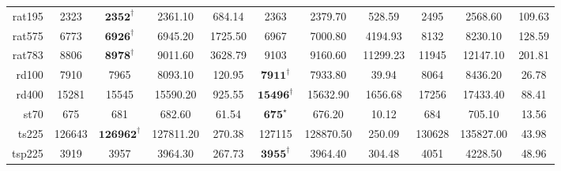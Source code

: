\documentclass[12pt]{ctexart}
\begin{document}
\begin{table}[htbp]
\begin{tabular}{rcccccccccc}
        rat195                        & 2323                              & $\textbf{2352}^\dag$        & 2361.10                                & 684.14           & 2363                    & 2379.70          & 528.59           & 2495                  & 2568.60          & 109.63           \\
        rat575                        & 6773                              & $\textbf{6926}^\dag$        & 6945.20                                & 1725.50          & 6967                    & 7000.80          & 4194.93          & 8132                  & 8230.10          & 128.59           \\
        rat783                        & 8806                              & $\textbf{8978}^\dag$        & 9011.60                                & 3628.79          & 9103                    & 9160.60          & 11299.23         & 11945                 & 12147.10         & 201.81           \\
        rd100                         & 7910                              & 7965                        & 8093.10                                & 120.95           & $\textbf{7911}^\dag$    & 7933.80          & 39.94            & 8064                  & 8436.20          & 26.78            \\
        rd400                         & 15281                             & 15545                       & 15590.20                               & 925.55           & $\textbf{15496}^\dag$   & 15632.90         & 1656.68          & 17256                 & 17433.40         & 88.41            \\
        st70                          & 675                               & 681                         & 682.60                                 & 61.54            & $\textbf{675}^\star$    & 676.20           & 10.12            & 684                   & 705.10           & 13.56            \\
        ts225                         & 126643                            & $\textbf{126962}^\dag$      & 127811.20                              & 270.38           & 127115                  & 128870.50        & 250.09           & 130628                & 135827.00        & 43.98            \\
        tsp225                        & 3919                              & 3957                        & 3964.30                                & 267.73           & $\textbf{3955}^\dag$    & 3964.40          & 304.48           & 4051                  & 4228.50          & 48.96            \\

\end{tabular}
\end{table}
\end{document}
